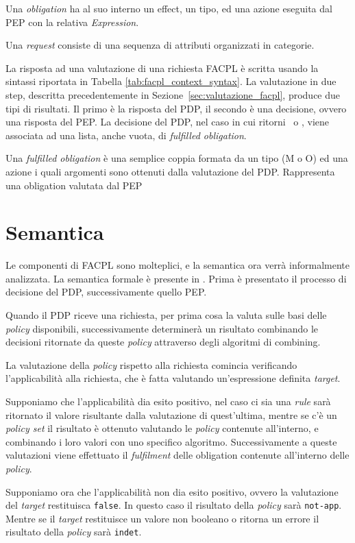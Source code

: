 Una \textit{obligation} ha al suo interno un effect, un tipo, ed una azione eseguita dal PEP con la relativa \textit{Expression}. \par
Una \textit{request} consiste di una sequenza di attributi organizzati in categorie. \par
La risposta ad una valutazione di una richiesta \ac{FACPL} è scritta usando la sintassi riportata in Tabella \ref{tab:facpl_context_syntax}.
La valutazione in due step, descritta precedentemente in Sezione~\ref{sec:valutazione_facpl}, produce due tipi di risultati. Il primo è la risposta del \ac{PDP}, il secondo è una decisione, ovvero una risposta del \ac{PEP}.
La decisione del \ac{PDP}, nel caso in cui ritorni \permit \ o \deny, viene associata ad una lista, anche vuota, di \textit{fulfilled obligation}. \par
Una \textit{fulfilled obligation} è una semplice coppia formata da un tipo (M o O) ed una azione i quali argomenti sono ottenuti dalla valutazione del \ac{PDP}. Rappresenta una obligation valutata dal \ac{PEP}

\section{Semantica}
\label{sec:semantica_originale}

Le componenti di \ac{FACPL} sono molteplici, e la semantica ora verrà informalmente analizzata. La semantica formale è presente in \cite{fullfacpl}.
Prima è presentato il processo di decisione del \ac{PDP}, successivamente quello \ac{PEP}. \par
Quando il \ac{PDP} riceve una richiesta, per prima cosa la valuta sulle basi delle \textit{policy} disponibili, successivamente determinerà un risultato combinando le decisioni ritornate da queste \textit{policy} attraverso degli algoritmi di combining. \par
La valutazione della \textit{policy} rispetto alla richiesta comincia verificando l'applicabilità alla richiesta, che è fatta valutando un'espressione definita \textit{target}. \par
Supponiamo che l'applicabilità dia esito positivo, nel caso ci sia una \textit{rule} sarà ritornato il valore risultante dalla valutazione di quest'ultima, mentre se c'è un \textit{policy set} il risultato è ottenuto valutando le \textit{policy} contenute all'interno, e combinando i loro valori con uno specifico algoritmo. Successivamente a queste valutazioni viene effettuato il \textit{fulfilment} delle obligation contenute all'interno delle \textit{policy}. \par
Supponiamo ora che l'applicabilità non dia esito positivo, ovvero la valutazione del \textit{target} restituisca \texttt{false}. In questo caso il risultato della \textit{policy} sarà \texttt{not-app}. Mentre se il \textit{target} restituisce un valore non booleano o ritorna un errore il risultato della \textit{policy} sarà \texttt{indet}.

